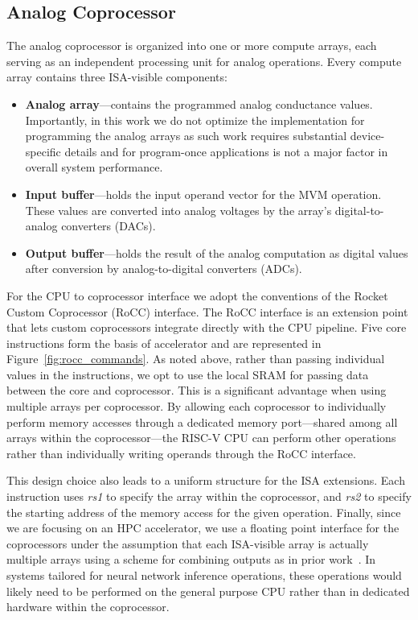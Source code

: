 \subsection{Analog Coprocessor}
The analog coprocessor is organized into one or more compute arrays, each serving as an independent processing unit for analog operations.
Every compute array contains three ISA-visible components:
\begin{itemize}
    \item \textbf{Analog array}---contains the programmed analog conductance values. 
        Importantly, in this work we do not optimize the implementation for programming the analog arrays as such work requires substantial device-specific details and for program-once applications is not a major factor in overall system performance.
    \item \textbf{Input buffer}---holds the input operand vector for the MVM operation.
        These values are converted into analog voltages by the array's digital-to-analog converters (DACs).
    \item \textbf{Output buffer}---holds the result of the analog computation as digital values after conversion by analog-to-digital converters (ADCs).
\end{itemize}

For the CPU to coprocessor interface we adopt the conventions of the Rocket Custom Coprocessor (RoCC) interface. \cite{Asanović:EECS-2016-17}
The RoCC interface is an extension point that lets custom coprocessors integrate directly with the CPU pipeline.
Five core instructions form the basis of accelerator and are represented in Figure~\ref{fig:rocc_commands}. 
As noted above, rather than passing individual values in the instructions, we opt to use the local SRAM for passing data between the core and coprocessor.
This is a significant advantage when using multiple arrays per coprocessor.
By allowing each coprocessor to individually perform memory accesses through a dedicated memory port---shared among all arrays within the coprocessor---the RISC-V CPU can perform other operations rather than individually writing operands through the RoCC interface.

This design choice also leads to a uniform structure for the ISA extensions.
Each instruction uses \textit{rs1} to specify the array within the coprocessor, and \textit{rs2} to specify the starting address of the memory access for the given operation.
Finally, since we are focusing on an HPC accelerator, we use a floating point interface for the coprocessors under the assumption that each ISA-visible array is actually multiple arrays using a scheme for combining outputs as in prior work~\cite{8416841,10.1145/3581784.3607077}.
In systems tailored for neural network inference operations, these operations would likely need to be performed on the general purpose CPU rather than in dedicated hardware within the coprocessor.

